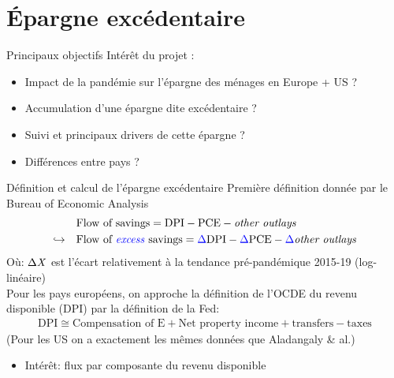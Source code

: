 \documentclass[9pt, xcolor={dvipsnames}]{beamer}
\newcommand{\blue}[1]{\textcolor{blue}{#1}}
\begin{document}
\section{Épargne excédentaire}

\begin{frame}{Principaux objectifs}
  Intérêt du projet :
  \begin{itemize}
    \item Impact de la pandémie sur l'épargne des ménages en Europe + US ? 
    \item Accumulation d'une épargne dite excédentaire ? 
    \item Suivi et principaux drivers de cette épargne ? 
    \item Différences entre pays ?  
  \end{itemize}
\end{frame}

\begin{frame}{Définition et calcul de l'épargne excédentaire}
  Première définition donnée par le Bureau of Economic Analysis
  \begin{align*}
    &\textrm{Flow of savings} = \textrm{DPI} - \textrm{PCE} - \textrm{\textit{other outlays}} \\
    \hookrightarrow \quad &\textrm{Flow of \blue{\textit{excess}} savings} = \blue{\Delta} \textrm{DPI} - \blue{\Delta} \textrm{PCE} - \blue{\Delta} \textrm{\textit{other outlays}}
  \end{align*}
  Où: $\Delta \textrm{\textit{X}}$ est l'écart relativement à la tendance pré-pandémique 2015-19 (log-linéaire) \\ 
  \vspace{.3cm}
  Pour les pays européens, on approche la définition de l'OCDE du revenu disponible (DPI) par la définition de la Fed:
  \begin{align*}
    \textrm{DPI} \cong  \textrm{Compensation of E} + \textrm{Net property income} + \textrm{transfers} - \textrm{taxes}
  \end{align*}
  (Pour les US on a exactement les mêmes données que Aladangaly \& al.)
  \vspace{.3cm}
  \begin{itemize}
    \item Intérêt: flux par composante du revenu disponible
  \end{itemize}
\end{frame}
\end{document}
